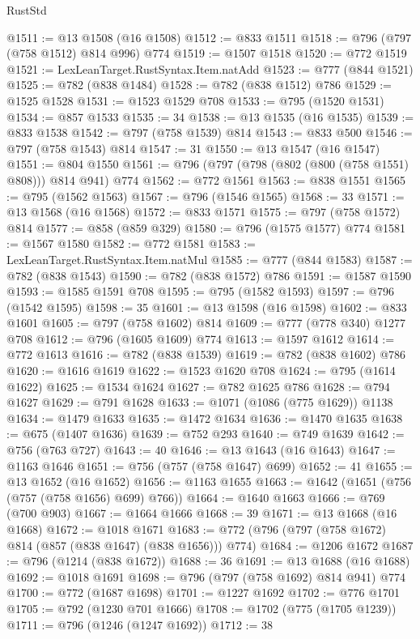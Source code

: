 \begin{lexlean}{RustStd}
\begin{coremodule}
@1511 := @13 @1508 (@16 @1508)
@1512 := @833 @1511
@1518 := @796 (@797 (@758 @1512) @814 @996) @774
@1519 := @1507 @1518
@1520 := @772 @1519
@1521 := LexLeanTarget.RustSyntax.Item.natAdd
@1523 := @777 (@844 @1521)
@1525 := @782 (@838 @1484)
@1528 := @782 (@838 @1512) @786
@1529 := @1525 @1528
@1531 := @1523 @1529 @708
@1533 := @795 (@1520 @1531)
@1534 := @857 @1533
@1535 := 34
@1538 := @13 @1535 (@16 @1535)
@1539 := @833 @1538
@1542 := @797 (@758 @1539) @814
@1543 := @833 @500
@1546 := @797 (@758 @1543) @814
@1547 := 31
@1550 := @13 @1547 (@16 @1547)
@1551 := @804 @1550
@1561 := @796 (@797 (@798 (@802 (@800 (@758 @1551) @808))) @814 @941) @774
@1562 := @772 @1561
@1563 := @838 @1551
@1565 := @795 (@1562 @1563)
@1567 := @796 (@1546 @1565)
@1568 := 33
@1571 := @13 @1568 (@16 @1568)
@1572 := @833 @1571
@1575 := @797 (@758 @1572) @814
@1577 := @858 (@859 @329)
@1580 := @796 (@1575 @1577) @774
@1581 := @1567 @1580
@1582 := @772 @1581
@1583 := LexLeanTarget.RustSyntax.Item.natMul
@1585 := @777 (@844 @1583)
@1587 := @782 (@838 @1543)
@1590 := @782 (@838 @1572) @786
@1591 := @1587 @1590
@1593 := @1585 @1591 @708
@1595 := @795 (@1582 @1593)
@1597 := @796 (@1542 @1595)
@1598 := 35
@1601 := @13 @1598 (@16 @1598)
@1602 := @833 @1601
@1605 := @797 (@758 @1602) @814
@1609 := @777 (@778 @340) @1277 @708
@1612 := @796 (@1605 @1609) @774
@1613 := @1597 @1612
@1614 := @772 @1613
@1616 := @782 (@838 @1539)
@1619 := @782 (@838 @1602) @786
@1620 := @1616 @1619
@1622 := @1523 @1620 @708
@1624 := @795 (@1614 @1622)
@1625 := @1534 @1624
@1627 := @782 @1625 @786
@1628 := @794 @1627
@1629 := @791 @1628
@1633 := @1071 (@1086 (@775 @1629)) @1138
@1634 := @1479 @1633
@1635 := @1472 @1634
@1636 := @1470 @1635
@1638 := @675 (@1407 @1636)
@1639 := @752 @293
@1640 := @749 @1639
@1642 := @756 (@763 @727)
@1643 := 40
@1646 := @13 @1643 (@16 @1643)
@1647 := @1163 @1646
@1651 := @756 (@757 (@758 @1647) @699)
@1652 := 41
@1655 := @13 @1652 (@16 @1652)
@1656 := @1163 @1655
@1663 := @1642 (@1651 (@756 (@757 (@758 @1656) @699) @766))
@1664 := @1640 @1663
@1666 := @769 (@700 @903)
@1667 := @1664 @1666
@1668 := 39
@1671 := @13 @1668 (@16 @1668)
@1672 := @1018 @1671
@1683 := @772 (@796 (@797 (@758 @1672) @814 (@857 (@838 @1647) (@838 @1656))) @774)
@1684 := @1206 @1672
@1687 := @796 (@1214 (@838 @1672))
@1688 := 36
@1691 := @13 @1688 (@16 @1688)
@1692 := @1018 @1691
@1698 := @796 (@797 (@758 @1692) @814 @941) @774
@1700 := @772 (@1687 @1698)
@1701 := @1227 @1692
@1702 := @776 @1701
@1705 := @792 (@1230 @701 @1666)
@1708 := @1702 (@775 (@1705 @1239))
@1711 := @796 (@1246 (@1247 @1692))
@1712 := 38

\end{coremodule}
\end{lexlean}
